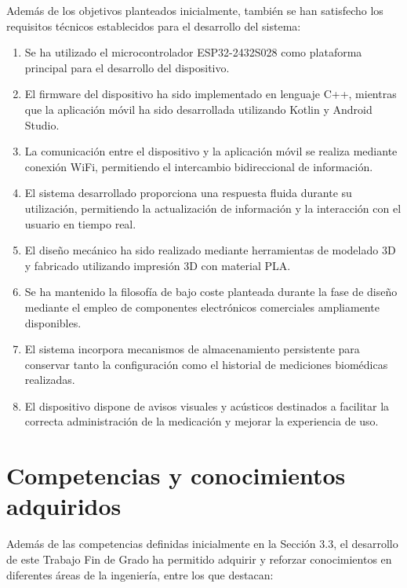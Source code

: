 Además de los objetivos planteados inicialmente, también se han satisfecho los requisitos técnicos establecidos para el desarrollo del sistema:

\begin{enumerate}

\item Se ha utilizado el microcontrolador ESP32-2432S028 como plataforma principal para el desarrollo del dispositivo.

\item El firmware del dispositivo ha sido implementado en lenguaje C++, mientras que la aplicación móvil ha sido desarrollada utilizando Kotlin y Android Studio.

\item La comunicación entre el dispositivo y la aplicación móvil se realiza mediante conexión WiFi, permitiendo el intercambio bidireccional de información.

\item El sistema desarrollado proporciona una respuesta fluida durante su utilización, permitiendo la actualización de información y la interacción con el usuario en tiempo real.

\item El diseño mecánico ha sido realizado mediante herramientas de modelado 3D y fabricado utilizando impresión 3D con material PLA.

\item Se ha mantenido la filosofía de bajo coste planteada durante la fase de diseño mediante el empleo de componentes electrónicos comerciales ampliamente disponibles.

\item El sistema incorpora mecanismos de almacenamiento persistente para conservar tanto la configuración como el historial de mediciones biomédicas realizadas.

\item El dispositivo dispone de avisos visuales y acústicos destinados a facilitar la correcta administración de la medicación y mejorar la experiencia de uso.

\end{enumerate}

\section{Competencias y conocimientos adquiridos}

Además de las competencias definidas inicialmente en la Sección 3.3, el desarrollo de este Trabajo Fin de Grado ha permitido adquirir y reforzar conocimientos en diferentes áreas de la ingeniería, entre los que destacan:

